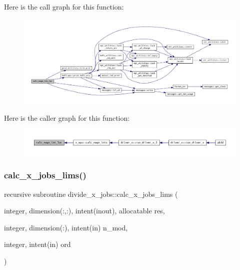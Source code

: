 Here is the call graph for this function\+:
\nopagebreak
\begin{figure}[H]
\begin{center}
\leavevmode
\includegraphics[width=350pt]{X__ops_8f90_a319069f9962e6d8964d1186afcea89e4_cgraph}
\end{center}
\end{figure}
Here is the caller graph for this function\+:
\nopagebreak
\begin{figure}[H]
\begin{center}
\leavevmode
\includegraphics[width=350pt]{X__ops_8f90_a319069f9962e6d8964d1186afcea89e4_icgraph}
\end{center}
\end{figure}
\mbox{\label{X__ops_8f90_a58e5d0ffc9b2330a15d917aa8766a42a}} 
\subsubsection{\texorpdfstring{calc\+\_\+x\+\_\+jobs\+\_\+lims()}{calc\_x\_jobs\_lims()}}
{\footnotesize\ttfamily recursive subroutine divide\+\_\+x\+\_\+jobs\+::calc\+\_\+x\+\_\+jobs\+\_\+lims (\begin{DoxyParamCaption}\item[{integer, dimension(\+:,\+:), intent(inout), allocatable}]{res,  }\item[{integer, dimension(\+:), intent(in)}]{n\+\_\+mod,  }\item[{integer, intent(in)}]{ord }\end{DoxyParamCaption})}



